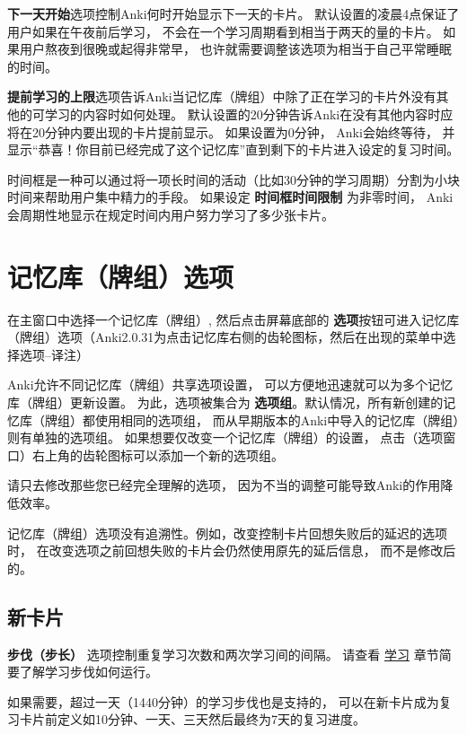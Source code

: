\documentclass[a4paper]{book}
\begin{document}
	\textbf{下一天开始}选项控制Anki何时开始显示下一天的卡片。 默认设置的凌晨4点保证了用户如果在午夜前后学习， 不会在一个学习周期看到相当于两天的量的卡片。 如果用户熬夜到很晚或起得非常早， 也许就需要调整该选项为相当于自己平常睡眠的时间。
	
	\textbf{提前学习的上限}选项告诉Anki当记忆库（牌组）中除了正在学习的卡片外没有其他的可学习的内容时如何处理。 默认设置的20分钟告诉Anki在没有其他内容时应将在20分钟内要出现的卡片提前显示。 如果设置为0分钟， Anki会始终等待， 并显示“恭喜！你目前已经完成了这个记忆库”直到剩下的卡片进入设定的复习时间。
	
	时间框是一种可以通过将一项长时间的活动（比如30分钟的学习周期）分割为小块时间来帮助用户集中精力的手段。 如果设定
	\textbf{时间框时间限制} 为非零时间， Anki会周期性地显示在规定时间内用户努力学习了多少张卡片。
	
	\chapter{记忆库（牌组）选项}\label{}
	
	在主窗口中选择一个记忆库（牌组）, 然后点击屏幕底部的
	\textbf{选项}按钮可进入记忆库（牌组）选项（Anki2.0.31为点击记忆库右侧的齿轮图标，然后在出现的菜单中选择选项--译注）
	
	Anki允许不同记忆库（牌组）共享选项设置， 可以方便地迅速就可以为多个记忆库（牌组）更新设置。 为此，选项被集合为
	\textbf{选项组}。默认情况，所有新创建的记忆库（牌组）都使用相同的选项组， 而从早期版本的Anki中导入的记忆库（牌组）则有单独的选项组。 如果想要仅改变一个记忆库（牌组）的设置， 点击（选项窗口）右上角的齿轮图标可以添加一个新的选项组。
	
	请只去修改那些您已经完全理解的选项， 因为不当的调整可能导致Anki的作用降低效率。
	
	\begin{shaded}
		记忆库（牌组）选项没有追溯性。例如，改变控制卡片回想失败后的延迟的选项时， 在改变选项之前回想失败的卡片会仍然使用原先的延后信息， 而不是修改后的。
	\end{shaded}
	
	\section{新卡片}
	\textbf{步伐（步长）} 选项控制重复学习次数和两次学习间的间隔。 请查看 \hyperref[learning]{学习} 章节简要了解学习步伐如何运行。
	
	如果需要，超过一天（1440分钟）的学习步伐也是支持的， 可以在新卡片成为复习卡片前定义如10分钟、一天、三天然后最终为7天的复习进度。
	
\end{document}
